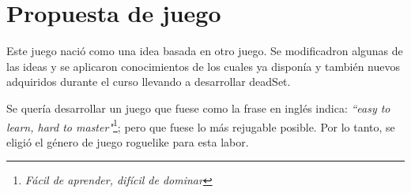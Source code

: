 \documentclass[11pt]{article}
\begin{document}
\tableofcontents
\newpage

\listoffigures
\newpage


\section{Propuesta de juego}

    Este juego nació como una idea basada en otro juego. Se modificadron algunas de las ideas y se aplicaron conocimientos de los cuales ya disponía y también nuevos adquiridos durante el curso llevando a desarrollar \textunderscore deadSet. 

    Se quería desarrollar un juego que fuese como la frase en inglés indica: \textit{“easy to learn, hard to master"}\footnote{\textit{Fácil de aprender, difícil de dominar}}; pero que fuese lo más rejugable posible. Por lo tanto, se eligió el género de juego roguelike para esta labor. 

\end{document}
